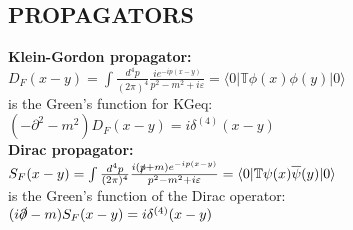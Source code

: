 \documentclass[a4paper, norsk, 8pt, landscape]{article}
\newcommand{\ket}[1] { |#1\rangle }
\newcommand{\bra}[1] { \langle #1 | }
\begin{document}
\begin{multicols*}{3}
\subsection*{\small  PROPAGATORS}
 {\textbf{Klein-Gordon propagator:}} \\
$D_F(x-y)
=\int \frac{d^4 p}{(2\pi)^4}\frac{ie^{-ip(x-y)}}{p^2-m^2+i\varepsilon}
=\bra{0}\mathbb{T} \phi(x)\phi(y)\ket{0}$ \\
is the Green's function for KGeq: \\
$(-\partial^2-m^2)D_F(x-y)=i\delta^{(4)}(x-y)$
\\
 {\textbf{Dirac propagator:}} \\
$S_F(x-y)
=\int \frac{d^4 p}{(2\pi)^4}\frac{i(\slashed{p}+m)e^{-ip(x-y)}}{p^2-m^2+i\varepsilon}
=\bra{0}\mathbb{T} \psi(x)\overline{\psi}(y)\ket{0}$ \\
is the Green's function of the Dirac operator: \\
$(i\slashed{\partial}-m)S_F(x-y)=i\delta^{(4)}(x-y)$


















\end{multicols*}
\end{document}
